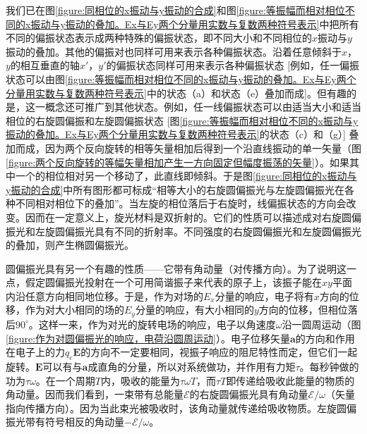 我们已在图\ref{figure:同相位的x振动与y振动的合成}和图\ref{figure:等振幅而相对相位不同的x振动与y振动的叠加。Ex与Ey两个分量用实数与复数两种符号表示}中把所有不同的偏振状态表示成两种特殊的偏振状态，即不同大小和不同相位的$x$振动与$y$振动的叠加。其他的偏振对也同样可用来表示各种偏振状态。沿着任意倾斜于$x$，$y$的相互垂直的轴$x'$，$y'$的偏振状态同样可用来表示各种偏振状态 [例如，任一偏振状态可以由图\ref{figure:等振幅而相对相位不同的x振动与y振动的叠加。Ex与Ey两个分量用实数与复数两种符号表示}中的状态（a）和状态（e）叠加而成]。但有趣的是，这一概念还可推广到其他状态。例如，任一线偏振状态可以由适当大小和适当相位的右旋圆偏振和左旋圆偏振状态 [图\ref{figure:等振幅而相对相位不同的x振动与y振动的叠加。Ex与Ey两个分量用实数与复数两种符号表示}的状态（c）和（g）] 叠加而成，因为两个反向旋转的相等矢量相加后得到一个沿直线振动的单一矢量（图\ref{figure:两个反向旋转的等幅矢量相加产生一方向固定但幅度振荡的矢量}）。如果其中一个的相位相对另一个移动了，此直线即倾斜。于是图\ref{figure:同相位的x振动与y振动的合成}中所有图形都可标成“相等大小的右旋圆偏振光与左旋圆偏振光在各种不同相对相位下的叠加”。当左旋的相位落后于右旋时，线偏振状态的方向会改变。因而在一定意义上，旋光材料是双折射的。它们的性质可以描述成对右旋圆偏振光和左旋圆偏振光具有不同的折射率。不同强度的右旋圆偏振光和左旋圆偏振光的叠加，则产生椭圆偏振光。

圆偏振光具有另一个有趣的性质——它带有角动量（对传播方向）。为了说明这一点，假定圆偏振光投射在一个可用简谐振子来代表的原子上，该振子能在$xy$平面内沿任意方向相同地位移。于是，作为对场的$E_x$分量的响应，电子将有$x$方向的位移，作为对大小相同的场的$E_y$分量的响应，有大小相同的$y$方向的位移，但相位落后$90^\circ$。这样一来，作为对光的旋转电场的响应，电子以角速度$\omega$沿一圆周运动（图\ref{figure:作为对圆偏振光的响应，电荷沿圆周运动}）。电子位移矢量$\boldsymbol{a}$的方向和作用在电子上的力$q_e\boldsymbol{E}$的方向不一定要相同，视振子响应的阻尼特性而定，但它们一起旋转。$\boldsymbol{E}$可以有与$\boldsymbol{a}$成直角的分量，所以对系统做功，并作用有力矩$\tau$。每秒钟做的功为$\tau\omega$。在一个周期$T$内，吸收的能量为$\tau\omega T$，而$\tau T$即传递给吸收此能量的物质的角动量。因而我们看到，一束带有总能量$\mathcal{E}$的右旋圆偏振光具有角动量$\mathcal{E}/\omega$（矢量指向传播方向）。因为当此束光被吸收时，该角动量就传递给吸收物质。左旋圆偏振光带有符号相反的角动量$-\mathcal{E}/\omega$。